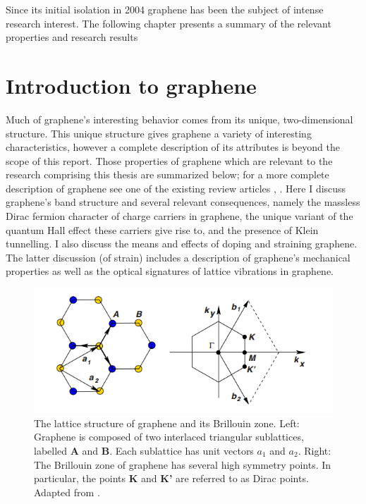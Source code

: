 \documentclass[edeposit,fullpage,draftthesis]{uiucthesis2009}
\begin{document}
    Since its initial isolation in 2004 graphene has been the subject of intense research interest. 
    The following chapter presents a summary of the relevant properties and research results 

    \section{Introduction to graphene}

    Much of graphene's interesting behavior comes from its unique, two-dimensional structure. 
    This unique structure gives graphene a variety of interesting characteristics, however a complete 
    description of its attributes is beyond the scope of this report. Those properties of graphene 
    which are relevant to the research comprising this thesis are summarized below; for a more complete description 
    of graphene see one of the existing review articles \cite{geim2007rise}, \cite{CastroNeto2009}. 
    Here I discuss graphene's band structure and several relevant consequences, namely 
    the massless Dirac fermion character of charge carriers in graphene, 
    the unique variant of the quantum Hall effect these carriers give rise to, 
    and the presence of Klein tunnelling.
    I also discuss the means and effects of doping and straining graphene. The latter discussion (of strain)
    includes a description of graphene's mechanical properties as well as the optical signatures of 
    lattice vibrations in graphene.
    
    \begin{figure}
    \centering
    \includegraphics{images/background/ElecPropertiesFig2.png}
    \caption[The lattice structure of graphene and its Brillouin zone]{The lattice structure of graphene and its Brillouin zone. Left: Graphene is composed of two interlaced triangular sublattices, labelled \textbf{A} and \textbf{B}. Each sublattice has unit vectors $a_1$ and $a_2$. Right: The Brillouin zone of graphene has several high symmetry points. In particular, the points \textbf{K} and \textbf{K'} are referred to as Dirac points. Adapted from \cite{CastroNeto2009}.}
    \label{fig:lattice}
    \end{figure}
		
\end{document}
